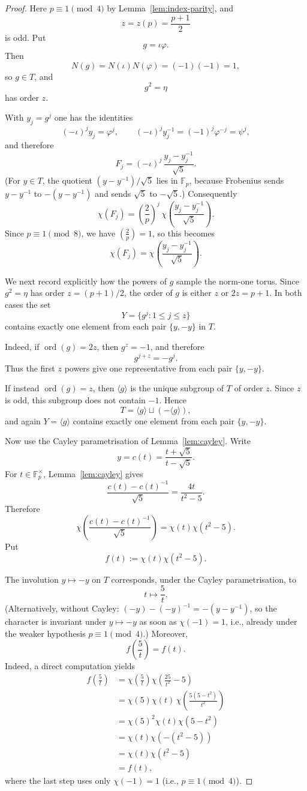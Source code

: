 \documentclass[11pt]{amsart}
\theoremstyle{plain}
\theoremstyle{definition}
\newcommand{\Fp}{\mathbb{F}_p}
\newcommand{\leg}[2]{\left(\frac{#1}{#2}\right)}
\begin{document}
\begin{proof}
Here $p\equiv1\pmod4$ by Lemma~\ref{lem:index-parity}, and
\[
  z=z(p)=\frac{p+1}{2}
\]
is odd. Put
\[
  g=\iota\varphi.
\]
Then
\[
  N(g)=N(\iota)N(\varphi)=(-1)(-1)=1,
\]
so $g\in T$, and
\[
  g^2=\eta
\]
has order $z$.

With $y_j=g^j$ one has the identities
\[
  (-\iota)^j y_j=\varphi^j,\qquad
  (-\iota)^j y_j^{-1}=(-1)^j\varphi^{-j}=\psi^j,
\]
and therefore
\[
  F_j=(-\iota)^{j}\,\frac{y_j-y_j^{-1}}{\sqrt5}.
\]
(For $y\in T$, the quotient $(y-y^{-1})/\sqrt5$ lies in $\Fp$, because
Frobenius sends $y-y^{-1}$ to $-(y-y^{-1})$ and sends $\sqrt5$ to $-\sqrt5$.)
Consequently
\[
  \chi(F_j)=\leg2p^{j}\,
  \chi\!\left(\frac{y_j-y_j^{-1}}{\sqrt5}\right).
\]
Since $p\equiv1\pmod8$, we have $\leg2p=1$, so this becomes
\[
  \chi(F_j)=
  \chi\!\left(\frac{y_j-y_j^{-1}}{\sqrt5}\right).
\]

We next record explicitly how the powers of $g$ sample the norm-one torus.
Since $g^2=\eta$ has order $z=(p+1)/2$, the order of $g$ is either $z$ or
$2z=p+1$. In both cases the set
\[
  Y=\{g^j:1\le j\le z\}
\]
contains exactly one element from each pair $\{y,-y\}$ in $T$.

Indeed, if $\operatorname{ord}(g)=2z$, then $g^z=-1$, and therefore
\[
  g^{j+z}=-g^j.
\]
Thus the first $z$ powers give one representative from each pair
$\{y,-y\}$.

If instead $\operatorname{ord}(g)=z$, then $\langle g\rangle$ is the unique
subgroup of $T$ of order $z$. Since $z$ is odd, this subgroup does not contain
$-1$. Hence
\[
  T=\langle g\rangle\sqcup(-\langle g\rangle),
\]
and again $Y=\langle g\rangle$ contains exactly one element from each pair
$\{y,-y\}$.

Now use the Cayley parametrisation of Lemma~\ref{lem:cayley}. Write
\[
  y=c(t)=\frac{t+\sqrt5}{t-\sqrt5}.
\]
For $t\in\mathbb F_p^{\times}$, Lemma~\ref{lem:cayley} gives
\[
  \frac{c(t)-c(t)^{-1}}{\sqrt5}
  =
  \frac{4t}{t^2-5}.
\]
Therefore
\[
  \chi\!\left(\frac{c(t)-c(t)^{-1}}{\sqrt5}\right)
  =
  \chi(t)\chi(t^2-5).
\]
Put
\[
  f(t):=\chi(t)\chi(t^2-5).
\]

The involution $y\mapsto -y$ on $T$ corresponds, under the Cayley
parametrisation, to
\[
  t\mapsto \frac5t.
\]
(Alternatively, without Cayley: $(-y)-(-y)^{-1}=-(y-y^{-1})$, so the
character is invariant under $y\mapsto-y$ as soon as $\chi(-1)=1$, i.e.,
already under the weaker hypothesis $p\equiv1\pmod4$.)
Moreover,
\[
  f\!\left(\frac5t\right)=f(t).
\]
Indeed, a direct computation yields
\[
\begin{aligned}
 f\!\left(\frac5t\right)
 &= \chi\!\left(\frac5t\right)
    \chi\!\left(\frac{25}{t^2}-5\right)  \\
 &= \chi(5)\chi(t)\,
    \chi\!\left(\frac{5(5-t^2)}{t^2}\right) \\
 &= \chi(5)^2\chi(t)\chi(5-t^2) \\
 &= \chi(t)\chi(-(t^2-5)) \\
 &= \chi(t)\chi(t^2-5) \\
 &= f(t),
\end{aligned}
\]
where the last step uses only $\chi(-1)=1$ (i.e., $p\equiv1\pmod4$).


\end{proof}
\end{document}
